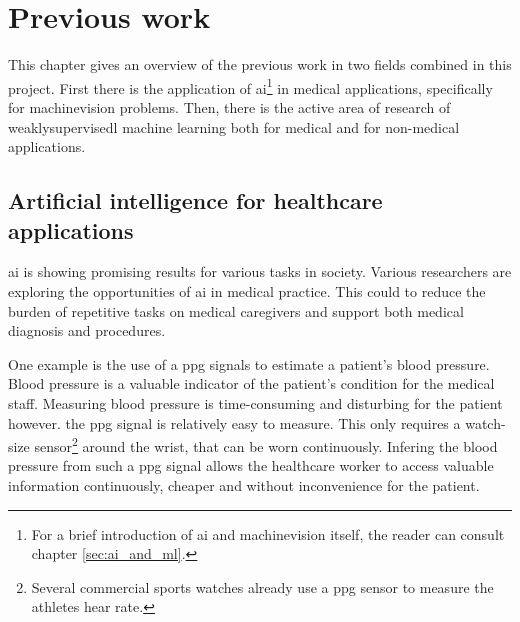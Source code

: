 \chapter{Previous work}
\par{
    This chapter gives an overview of the previous work in two fields combined in this project.
    First there is the application of \Gls{ai}\footnote{For a brief introduction of \Gls{ai} and \Gls{machinevision} itself, the reader can consult chapter \ref{sec:ai_and_ml}.} 
    in medical applications, specifically for \Gls{machinevision} problems.
    Then, there is the active area of research of \Gls{weaklysupervisedl} machine learning both for medical and for non-medical applications.
}



\section{Artificial intelligence for healthcare applications}

\par{
    \Gls{ai} is showing promising results for various tasks in society.
    Various researchers are exploring the opportunities of \Gls{ai} in medical practice.
    This could to reduce the burden of repetitive tasks on medical caregivers and support both medical diagnosis and procedures.
}
\par{
    One example is the use of a \acrfull{ppg} signals to estimate a patient's blood pressure.
    Blood pressure is a valuable indicator of the patient's condition for the medical staff.
    Measuring blood pressure is time-consuming and disturbing for the patient however. 
    the \acrshort{ppg} signal is relatively easy to measure. This only requires a watch-size sensor\footnote{Several commercial sports watches already use a \acrshort{ppg} sensor to measure the athletes hear rate.} 
    around the wrist, that can be worn continuously.
    Infering the blood pressure from such a \acrshort{ppg} signal allows the healthcare worker to access valuable information continuously, cheaper and without inconvenience for the patient.
}

